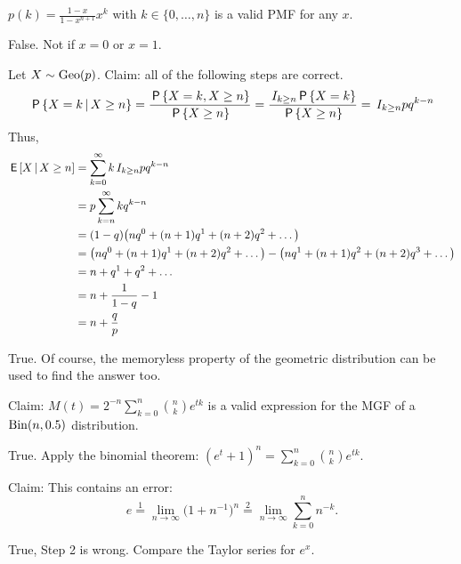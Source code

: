 \documentclass[tf-tutorial-all.tex]{subfiles}
\begin{document}
\begin{truefalse}
$p(k) = \frac{1-x}{1-x^{n+1}} x^k$ with $k \in \{0, \dots, n\}$ is a valid PMF for any $x$.
\begin{solution}
  False. Not if $x = 0$ or $x = 1$.
\end{solution}
\end{truefalse}

\begin{truefalse}
  Let $X \sim \mathrm{Geo}(p)$. Claim: all of the following steps are correct.
  \begin{equation*}
    \,\mathsf{P}\left\{X = k \,\middle|\, X \geq n\right\}
    = \frac{\,\mathsf{P}\left\{X=k, X \geq n\right\}}{\,\mathsf{P}\left\{X \geq n\right\}}
    = \frac{\,I_{k \geq n} \,\mathsf{P}\left\{X = k\right\}}{\,\mathsf{P}\left\{X \geq n\right\}}
    = \,I_{k \geq n} pq^{k-n}
  \end{equation*}
  Thus,
  \begin{align*}
    \,\mathsf{E}\left[X \,\middle|\, X \geq n\right] &= \sum_{k=0}^\infty k \,I_{k \geq n} pq^{k-n}\\
    &=  p \sum_{k=n}^\infty kq^{k-n}\\
    &= (1 - q) \big(n q^0 + (n+1) q^1 + (n+2) q^2 + \dots\big)\\
    &= \big(n q^0 + (n+1) q^1 + (n+2) q^2 + \dots\big) - \big(n q^1 + (n+1)q^2 + (n+2)q^3 + \dots\big)\\
    &= n + q^1 + q^2 + \dots\\
    &= n + \frac{1}{1-q} - 1\\
    &= n + \frac{q}{p}\\
  \end{align*}
\begin{solution}
    True. Of course, the memoryless property of the geometric
    distribution can be used to find the answer too.
\end{solution}
\end{truefalse}


\begin{truefalse}
Claim:  $M(t) = 2^{-n} \sum_{k=0}^n \binom{n}{k} e^{tk}$ is a valid expression for the MGF of a $\mathrm{Bin}(n, 0.5)$ distribution.
\begin{solution}
True. Apply the binomial theorem: $(e^t + 1)^n = \sum_{k=0}^n \binom{n}{k} e^{tk}$.
\end{solution}
\end{truefalse}

\begin{truefalse}
 Claim:  This contains an error:
  \begin{equation*}
e \stackrel 1 =  \lim_{n\to\infty} \big(1+n^{-1}\big)^n   \stackrel{2} = \lim_{n\to\infty} \sum^n_{k=0} n^{-k}.
  \end{equation*}
\begin{solution}
True, Step 2 is wrong. Compare the Taylor series for $e^{x}$.
\end{solution}
\end{truefalse}
\end{document}
